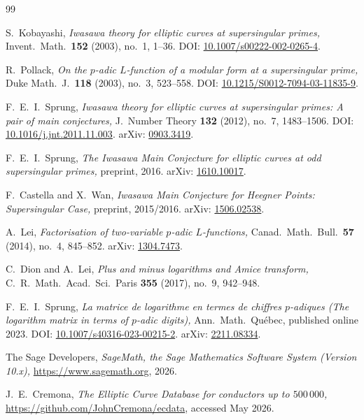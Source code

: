 \documentclass[11pt,a4paper]{amsart}
\theoremstyle{definition}
\begin{document}
\begin{thebibliography}{99}

S.~Kobayashi,
\emph{Iwasawa theory for elliptic curves at supersingular primes,}
Invent.\ Math.\ \textbf{152} (2003), no.~1, 1--36.
DOI: \href{https://doi.org/10.1007/s00222-002-0265-4}{10.1007/s00222-002-0265-4}.

R.~Pollack,
\emph{On the $p$-adic $L$-function of a modular form at a supersingular prime,}
Duke Math.\ J.\ \textbf{118} (2003), no.~3, 523--558.
DOI: \href{https://doi.org/10.1215/S0012-7094-03-11835-9}{10.1215/S0012-7094-03-11835-9}.

F.~E.~I.~Sprung,
\emph{Iwasawa theory for elliptic curves at supersingular primes: A pair of main conjectures,}
J.\ Number Theory \textbf{132} (2012), no.~7, 1483--1506.
DOI: \href{https://doi.org/10.1016/j.jnt.2011.11.003}{10.1016/j.jnt.2011.11.003}.
arXiv: \href{https://arxiv.org/abs/0903.3419}{0903.3419}.

F.~E.~I.~Sprung,
\emph{The Iwasawa Main Conjecture for elliptic curves at odd supersingular primes,}
preprint, 2016.
arXiv: \href{https://arxiv.org/abs/1610.10017}{1610.10017}.

F.~Castella and X.~Wan,
\emph{Iwasawa Main Conjecture for Heegner Points: Supersingular Case,}
preprint, 2015/2016.
arXiv: \href{https://arxiv.org/abs/1506.02538}{1506.02538}.

A.~Lei,
\emph{Factorisation of two-variable $p$-adic $L$-functions,}
Canad.\ Math.\ Bull.\ \textbf{57} (2014), no.~4, 845--852.
arXiv: \href{https://arxiv.org/abs/1304.7473}{1304.7473}.

C.~Dion and A.~Lei,
\emph{Plus and minus logarithms and Amice transform,}
C.~R.\ Math.\ Acad.\ Sci.\ Paris \textbf{355} (2017), no.~9, 942--948.

F.~E.~I.~Sprung,
\emph{La matrice de logarithme en termes de chiffres $p$-adiques (The logarithm matrix in terms of $p$-adic digits),}
Ann.\ Math.\ Qu\'ebec, published online 2023.
DOI: \href{https://doi.org/10.1007/s40316-023-00215-2}{10.1007/s40316-023-00215-2}.
arXiv: \href{https://arxiv.org/abs/2211.08334}{2211.08334}.

The Sage Developers,
\emph{SageMath, the Sage Mathematics Software System (Version 10.x),}
\url{https://www.sagemath.org}, 2026.

J.~E.~Cremona,
\emph{The Elliptic Curve Database for conductors up to $500\,000$,}
\url{https://github.com/JohnCremona/ecdata}, accessed May 2026.

\end{thebibliography}
\end{document}
